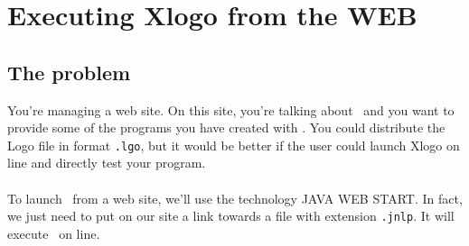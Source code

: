 \chapter{Executing Xlogo from the WEB}
\section{The problem}
\noindent
You're managing a web site. On this site, you're talking about \xlogo\ and you want to provide some of the programs you have created with \xlogo. You could distribute the Logo file in format \texttt{.lgo}, but it would be better if the user could launch Xlogo on line and directly test your program. \\ \\
To launch \xlogo\ from a web site, we'll use the technology \textsc{JAVA WEB START}. In fact, we just need to put on our site a link towards a file with extension \texttt{.jnlp}. It will execute \xlogo\ on line.
